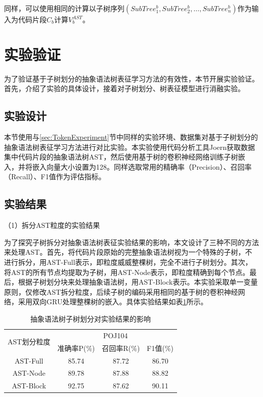 同样，可以使用相同的计算以子树序列$\left(SubTree_{1}^{b},SubTree_{2}^{b},\ldots,SubTree_{n}^{b}\right)$作为输入为代码片段$C_{b}$计算$V_{b}^{AST}$。


\section{实验验证}
\label{sec:ASTExperiment}
为了验证基于子树划分的抽象语法树表征学习方法的有效性，本节开展实验验证。首先，介绍了实验的具体设计，接着对子树划分、树表征模型进行消融实验。

\subsection{实验设计}
\label{subsec:ASTDesign}

本节使用与\ref{sec:TokenExperiment}节中同样的实验环境、数据集对基于子树划分的抽象语法树表征学习方法进行对比实验。本实验使用代码分析工具Joern获取数据集中代码片段的抽象语法树AST，然后使用基于树的卷积神经网络训练子树嵌入，并将嵌入向量大小设置为128。同样选取常用的精确率（Precision）、召回率（Recall）、F1值作为评估指标。

\subsection{实验结果}
\label{subsec:TokenResult}

（1）拆分AST粒度的实验结果

为了探究子树拆分对抽象语法树表征实验结果的影响，本文设计了三种不同的方法来处理AST。首先，将代码片段原始的完整抽象语法树视为一个特殊的子树，不进行拆分，用AST-Full表示，即粒度威威整棵树，完全不进行子树划分。其次，将AST的所有节点均提取为子树，用AST-Node表示，即粒度精确到每个节点。最后，根据子树划分块来处理抽象语法树，用AST-Block表示。本实验采取单一变量原则，仅修改AST拆分粒度，后续子树的编码采用相同的基于树的卷积神经网络，采用双向GRU处理整棵树的嵌入。具体实验结果如表\ref{tab:subtree}所示。


\begin{table}[htp] 
  \centering
  \caption{抽象语法树子树划分对实验结果的影响} 
  \label{tab:subtree}
  \begin{tabular*}{0.9\textwidth}{@{\extracolsep{\fill}}cccc}
  \toprule
  \multirow{2}{*}{AST划分粒度} & \multicolumn{3}{c}{POJ104} \\
  \cmidrule{2-4} 
   & 准确率P(\%) & 召回率R(\%) & F1值(\%)  \\  
  \midrule
    AST-Full			&85.74	  &87.72		   &86.70 \\
    AST-Node      &89.78	  &87.88		   &88.82 \\
    AST-Block			&92.75	  &87.62		   &90.11 \\
  \bottomrule
  \end{tabular*}
\end{table}

